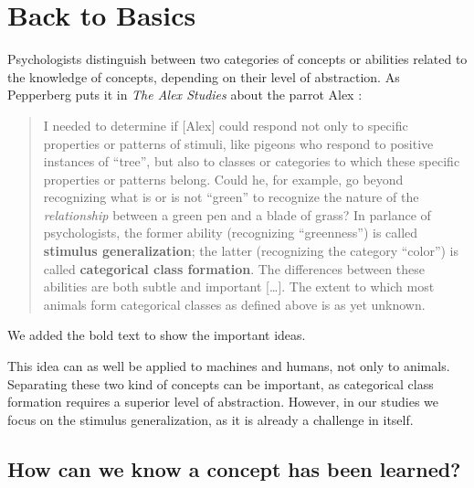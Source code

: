 \chapter{Back to Basics}
\label{chapter:back_to_basics}

Psychologists distinguish between two categories of concepts or abilities related to the knowledge of concepts, depending on their level of abstraction. As Pepperberg puts it in \textit{The Alex Studies} about the parrot Alex \cite[p.52]{pepperberg1999alex}:

\blockquote{I needed to determine if [Alex] could respond not only to specific properties or patterns of stimuli, like pigeons who respond to positive instances of ``tree'', but also to classes or categories to which these specific properties or patterns belong. Could he, for example, go beyond recognizing what is or is not ``green'' to recognize the nature of the \textit{relationship} between a green pen and a blade of grass? In parlance of psychologists, the former ability (recognizing ``greenness'') is called \textbf{stimulus generalization}; the latter (recognizing the category ``color'') is called \textbf{categorical class formation}. The differences between these abilities are both subtle and important [\dots]. The extent to which most animals form categorical classes as defined above is as yet unknown.}

We added the bold text to show the important ideas.

This idea can as well be applied to machines and humans, not only to animals. Separating these two kind of concepts can be important, as categorical class formation requires a superior level of abstraction. However, in our studies we focus on the stimulus generalization, as it is already a challenge in itself.

\section{How can we know a concept has been learned?}
\label{sec:learned}


